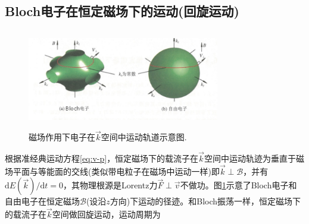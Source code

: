 \subsection{Bloch电子在恒定磁场下的运动(回旋运动)}
\begin{figure}[h!]
\centering
\vspace*{-0.10in}
\includegraphics[height=1.70in,width=3.30in,viewport=0 0 95 47,clip]{Figures/Electron-in-Magnetic_Field.png}
\caption{\small \textrm{磁场作用下电子在$\vec k$空间中运动轨道示意图.}}%
\label{Fig:Electron-in-Magnetic_Field}
\end{figure}
根据准经典运动方程\eqref{eq:v-p}，恒定磁场下的载流子在$\vec k$空间中运动轨迹为垂直于磁场平面与等能面的交线(类似带电粒子在磁场中运动一样)即$\vec k\perp\mathscr{B}$，并有$\mathrm{d}E(\vec k)/\mathrm{d}t=0$，其物理根源是Lorentz力$\vec F\perp\vec v$不做功。图\ref{Fig:Electron-in-Magnetic_Field}示意了Bloch电子和自由电子在恒定磁场$\mathscr{B}$(设沿$z$方向)下运动的径迹。和Bloch振荡一样，恒定磁场下的载流子在$\vec k$空间做回旋运动，运动周期为

